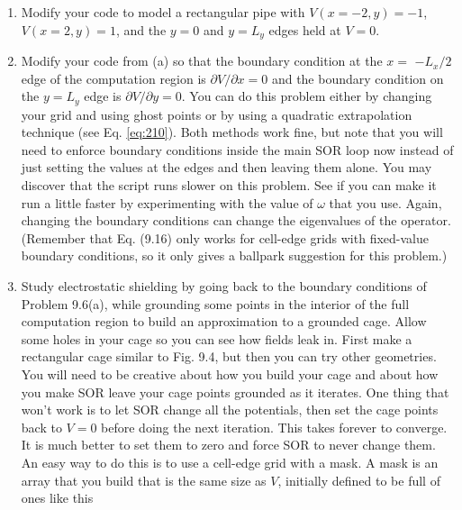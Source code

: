 \begin{problem}\label{P9.6}
\begin{enumerate}[label=(\alph*)]
\item Modify your code to model a rectangular pipe with $V(x=-2, y)=-1$, $V(x=2, y)=1$, and the $y=0$ and $y=L_{y}$ edges held at $V=0$.
\item Modify your code from (a) so that the boundary condition at the $x=$ $-L_{x} / 2$ edge of the computation region is $\partial V / \partial x=0$ and the boundary condition on the $y=L_{y}$ edge is $\partial V / \partial y=0$. You can do this problem either by changing your grid and using ghost points or by using a quadratic extrapolation technique (see Eq. \eqref{eq:210}). Both methods work fine, but note that you will need to enforce boundary conditions inside the main SOR loop now instead of just setting the values at the edges and then leaving them alone.
You may discover that the script runs slower on this problem. See if you can make it run a little faster by experimenting with the value of $\omega$ that you use. Again, changing the boundary conditions can change the eigenvalues of the operator. (Remember that Eq. (9.16) only works for cell-edge grids with fixed-value boundary conditions, so it only gives a ballpark suggestion for this problem.)
\item Study electrostatic shielding by going back to the boundary conditions of Problem 9.6(a), while grounding some points in the interior of the full computation region to build an approximation to a grounded cage. Allow some holes in your cage so you can see how fields leak in. First make a rectangular cage similar to Fig. 9.4, but then you can try other geometries.
You will need to be creative about how you build your cage and about how you make SOR leave your cage points grounded as it iterates. One thing that won\rq t work is to let SOR change all the potentials, then set the cage points back to $V=0$ before doing the next iteration. This takes forever to converge. It is much better to set them to zero and force SOR to never change them. An easy way to do this is to use a cell-edge grid with a mask. A mask is an array that you build that is the same size as $V$, initially defined to be full of ones like this

\end{enumerate}
\end{problem}
